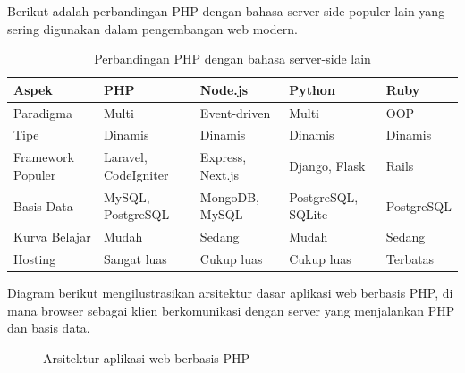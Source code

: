 Berikut adalah perbandingan PHP dengan bahasa server-side populer lain yang sering digunakan dalam pengembangan web modern.

\begin{table}[H]
\centering
\begin{tabular}{|P{2.5cm}|P{2cm}|P{2.5cm}|P{2.5cm}|P{2.5cm}|}
\hline
\textbf{Aspek} & \textbf{PHP} & \textbf{Node.js} & \textbf{Python} & \textbf{Ruby} \\
\hline
Paradigma & Multi & Event-driven & Multi & OOP \\
\hline
Tipe & Dinamis & Dinamis & Dinamis & Dinamis \\
\hline
Framework Populer & Laravel, CodeIgniter & Express, Next.js & Django, Flask & Rails \\
\hline
Basis Data & MySQL, PostgreSQL & MongoDB, MySQL & PostgreSQL, SQLite & PostgreSQL \\
\hline
Kurva Belajar & Mudah & Sedang & Mudah & Sedang \\
\hline
Hosting & Sangat luas & Cukup luas & Cukup luas & Terbatas \\
\hline
\end{tabular}
\caption{Perbandingan PHP dengan bahasa server-side lain}
\end{table}

Diagram berikut mengilustrasikan arsitektur dasar aplikasi web berbasis PHP, di mana browser sebagai klien berkomunikasi dengan server yang menjalankan PHP dan basis data.

\begin{figure}[H]
\centering
{}
\caption{Arsitektur aplikasi web berbasis PHP}
\end{figure}

